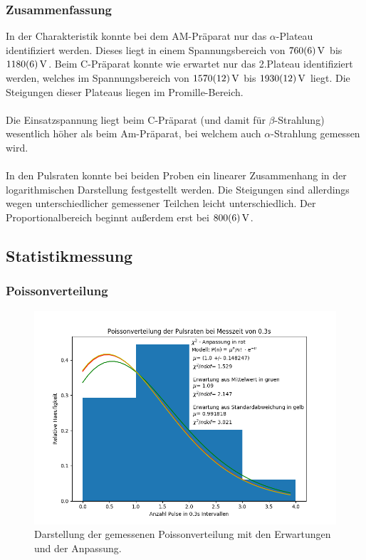 \documentclass[12pt,a4paper]{article}
\begin{document}
\subsubsection{Zusammenfassung}
In der Charakteristik konnte bei dem AM-Präparat nur das $\alpha$-Plateau identifiziert werden. Dieses liegt in einem Spannungsbereich von $\SI{760\pm 6}{V}$ bis $\SI{1180\pm 6}{V}$. Beim C-Präparat konnte wie erwartet nur das 2.Plateau identifiziert werden, welches im Spannungsbereich von $\SI{1570\pm 12}{V}$ bis $\SI{1930\pm 12}{V}$ liegt. Die Steigungen dieser Plateaus liegen im Promille-Bereich.\\
\\
Die Einsatzspannung liegt beim C-Präparat (und damit für $\beta$-Strahlung) wesentlich höher als beim Am-Präparat, bei welchem auch $\alpha$-Strahlung gemessen wird.\\
\\
In den Pulsraten konnte bei beiden Proben ein linearer Zusammenhang in der logarithmischen Darstellung festgestellt werden. Die Steigungen sind allerdings wegen unterschiedlicher gemessener Teilchen leicht unterschiedlich. Der Proportionalbereich beginnt außerdem erst bei $\SI{800\pm 6}{V}$.
\newpage


\subsection{Statistikmessung}

\subsubsection{Poissonverteilung}
\begin{figure}
\centering
\includegraphics[scale=0.8]{Bilder/poisson.PNG}
\caption{Darstellung der gemessenen Poissonverteilung mit den Erwartungen und der Anpassung.}
\label{fig:Poisson}
\end{figure}
\end{document}

